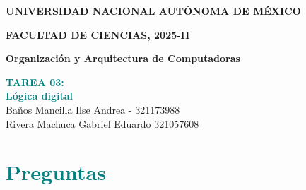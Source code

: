 \documentclass[a4paper,12pt]{article}
\begin{document}
\begin{titlepage}
    \centering
    \vspace*{1cm}
    \textbf{UNIVERSIDAD NACIONAL AUTÓNOMA DE MÉXICO}
    
    \vspace{0.5cm}
    \textbf{FACULTAD DE CIENCIAS, 2025-II}
    
    \vspace{0.5cm}
    \textbf{Organización y Arquitectura de Computadoras}
    
    \vspace{5 cm}
    \textbf{\LARGE \textcolor{teal}{TAREA 03:}}
    \vspace{1cm}\\
    \textbf{\LARGE \textcolor{teal}{Lógica digital}}
    \vspace{3cm}\\

    \Large Baños Mancilla Ilse Andrea - 321173988\\
    \vspace{1 cm}
    \Large Rivera Machuca Gabriel Eduardo 321057608
    
  
    \vspace{1cm}
\end{titlepage}

\section*{\textcolor{teal}{Preguntas}}
\end{document}
